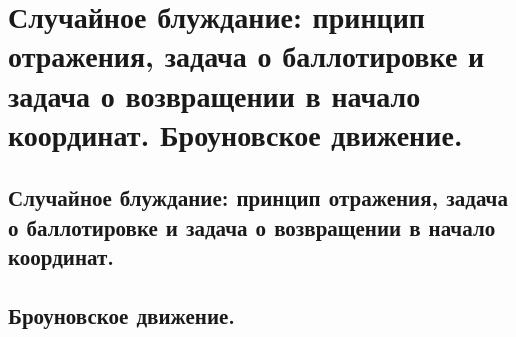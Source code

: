 \section{Случайное блуждание: принцип отражения, задача о баллотировке и задача о возвращении в начало координат. Броуновское движение.}

\subsection{Случайное блуждание: принцип отражения, задача о баллотировке и задача о возвращении в начало координат.}

\subsection{Броуновское движение.}


